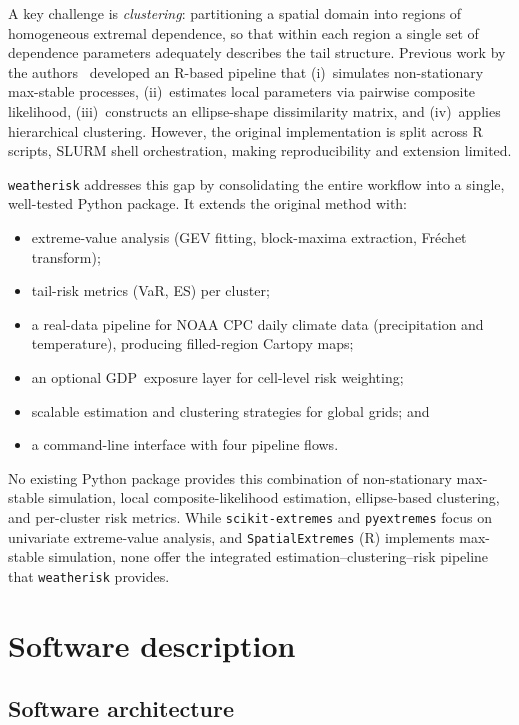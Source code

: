\documentclass[a4paper]{elsarticle}
\begin{document}
A key challenge is \emph{clustering}: partitioning a spatial domain into
regions of homogeneous extremal dependence, so that within each region a
single set of dependence parameters adequately describes the tail structure.
Previous work by the authors~\cite{justus2024} developed an R-based pipeline that
(i)~simulates non-stationary max-stable processes,
(ii)~estimates local parameters via pairwise composite likelihood,
(iii)~constructs an ellipse-shape dissimilarity matrix, and
(iv)~applies hierarchical clustering.
However, the original implementation is split across R scripts, SLURM shell
orchestration, making
reproducibility and extension limited.

\texttt{weatherisk} addresses this gap by consolidating the entire workflow
into a single, well-tested Python package.
It extends the original method with:
\begin{itemize}
\item extreme-value analysis (GEV fitting, block-maxima extraction, Fr\'{e}chet transform);
\item tail-risk metrics (VaR, ES) per cluster;
\item a real-data pipeline for NOAA CPC daily climate data (precipitation and temperature),
  producing filled-region Cartopy maps;
\item an optional GDP~exposure layer for cell-level risk weighting;
\item scalable estimation and clustering strategies for global grids; and
\item a command-line interface with four pipeline flows.
\end{itemize}

No existing Python package provides this combination of non-stationary
max-stable simulation, local composite-likelihood estimation, ellipse-based
clustering, and per-cluster risk metrics.
While \texttt{scikit-extremes} and \texttt{pyextremes} focus on univariate
extreme-value analysis, and \texttt{SpatialExtremes} (R) implements max-stable
simulation, none offer the integrated estimation--clustering--risk pipeline
that \texttt{weatherisk} provides.

\section{Software description}
\label{sec:description}

\subsection{Software architecture}
\label{sec:architecture}
\end{document}
